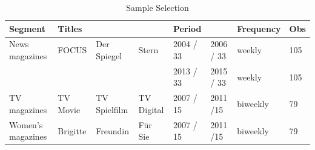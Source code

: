 \documentclass[12pt,a4paper,notitlepage]{article}
\begin{document}
\begin{table}[ht]\centering
	\caption{Sample Selection}
\begin{adjustbox}{width=\textwidth}	
\begin{tabular}{llllllll}
\hline 
	 Segment 	& Titles & & & Period &  & Frequency & Obs \\ \hline
	News magazines 		& FOCUS & Der Spiegel & Stern & 2004 / 33 & 2006 / 33 & weekly & 105 \\
	 &  &  &  & 2013 / 33 & 2015 / 33 & weekly & 105 \\ \hline
	TV magazines 			& TV Movie & TV Spielfilm & TV Digital & 2007 / 15 & 2011 /15 & biweekly & 79 \\ \hline
	Women's magazines	& Brigitte & Freundin & Für Sie & 2007 / 15 & 2011 /15 & biweekly & 79 \\ \hline
\end{tabular}
	\label{t_sample selection}
\end{adjustbox}
\end{table}
\end{document}
